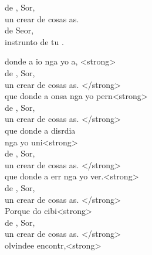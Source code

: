\begin{cancion}%
	\begin{chorus}%
	 de , Sor,  \\
	un crear de cosas as. \\
	 de  Seor,\\
	instrunto de tu .  \\
	\end{chorus}%
	 donde a io nga yo a, <strong>\\
	 de , Sor,  \\
	un crear de cosas as. </strong>\\
	que donde a onsa nga yo pern<strong>\\
	 de , Sor,  \\
	un crear de cosas as. </strong>\\
	que donde a disrdia \\
	nga yo uni<strong>\\
	 de , Sor,  \\
	un crear de cosas as. </strong>\\
	que donde a err nga yo ver.<strong>\\
	 de , Sor,  \\
	un crear de cosas as. </strong>\\
	Porque do  cibi<strong>\\
	 de , Sor,  \\
	un crear de cosas as. </strong>\\
	olvindee encontr,<strong> \\

\end{cancion}
